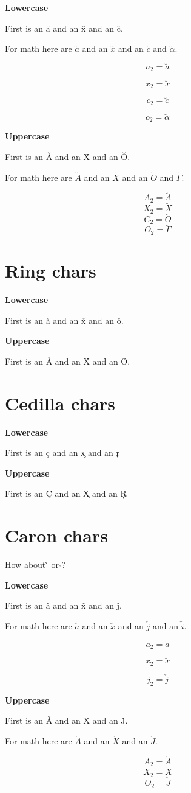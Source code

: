 \documentclass{article}
\begin{document}
\textbf{Lowercase}

First is an \u{a} and an \u{x} and an \u{c}.

For math here are $\breve{a}$ and an $\breve{x}$ and an $\breve{c}$ and $\breve{\alpha}$.

$$a_2=\breve{a}$$

$$x_2=\breve{x}$$

$$c_2=\breve{c}$$

$$o_2=\breve{\alpha}$$

\textbf{Uppercase}

First is an \u{A} and an \u{X} and an \u{O}.

For math here are $\breve{A}$ and an $\breve{X}$ and an $\breve{O}$ and $\breve{\Gamma}$.

$$A_2=\breve{A}$$
$$X_2=\breve{X}$$
$$C_2=\breve{O}$$
$$O_2=\breve{\Gamma}$$

\section{Ring chars}
\textbf{Lowercase}

First is an \r{a} and an \r{x} and an \r{o}.

\textbf{Uppercase}

First is an \r{A} and an \r{X} and an \r{O}.




\section{Cedilla chars}
\textbf{Lowercase}

First is an \c{c} and an \c{x} and an \c{r}

\textbf{Uppercase}

First is an \c{C} and an \c{X} and an \c{R}




\section{Caron chars}

How about \v{} or $\check{}$? 

\textbf{Lowercase}

First is an \v{a} and an \v{x} and an \v{j}.

For math here are $\check{a}$ and an $\check{x}$ and an $\check{j}$  and an $\check{i}$.

$$a_2=\check{a}$$

$$x_2=\check{x}$$

$$j_2=\check{j}$$

\textbf{Uppercase}

First is an \v{A} and an \v{X} and an \v{J}.

For math here are $\check{A}$ and an $\check{X}$ and an $\check{J}$.

$$A_2=\check{A}$$
$$X_2=\check{X}$$
$$O_2=\check{J}$$
\end{document}
